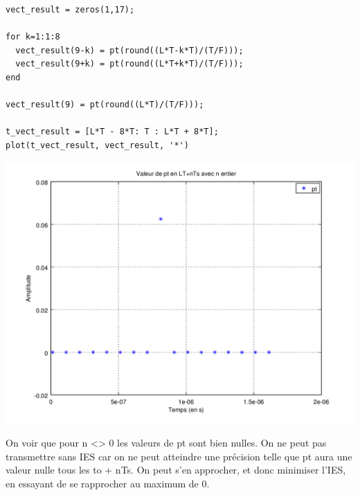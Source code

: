 \documentclass{acm_proc_article-sp}
\begin{document}
\begin{center}
\begin{lstlisting}
vect_result = zeros(1,17);

for k=1:1:8
  vect_result(9-k) = pt(round((L*T-k*T)/(T/F)));
  vect_result(9+k) = pt(round((L*T+k*T)/(T/F)));
end

vect_result(9) = pt(round((L*T)/(T/F)));

t_vect_result = [L*T - 8*T: T : L*T + 8*T];
plot(t_vect_result, vect_result, '*')
\end{lstlisting}

\includegraphics[scale=0.45]{pt_nyquist_10.png}
\end{center}

On voir que pour n <> 0 les valeurs de pt sont bien nulles. On ne peut pas transmettre sans IES car on ne peut atteindre une précision telle que pt aura une valeur nulle tous les to + nTs. On peut s'en approcher, et donc minimiser l'IES, en essayant de se rapprocher au maximum de 0.
\end{document}
